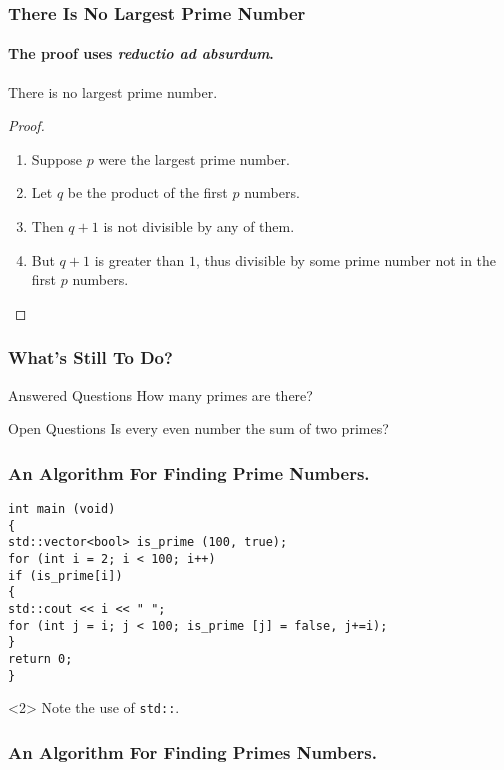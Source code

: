 \begin{frame}
\frametitle{There Is No Largest Prime Number}
\framesubtitle{The proof uses \textit{reductio ad absurdum}.}
\begin{theorem}
There is no largest prime number.
\end{theorem}
\begin{proof}
\begin{enumerate}
\item<1-> Suppose $p$ were the largest prime number.
\item<2-> Let $q$ be the product of the first $p$ numbers.
\item<3-> Then $q + 1$ is not divisible by any of them.
\item<1-> But $q + 1$ is greater than $1$, thus divisible by some prime
number not in the first $p$ numbers.\qedhere
\end{enumerate}
\end{proof}
\end{frame}

\begin{frame}
\frametitle{What’s Still To Do?}
\begin{block}{Answered Questions}
How many primes are there?
\end{block}
\begin{block}{Open Questions}
Is every even number the sum of two primes?
\end{block}
\end{frame}

\begin{frame}[fragile]
\frametitle{An Algorithm For Finding Prime Numbers.}
\begin{verbatim}
int main (void)
{
std::vector<bool> is_prime (100, true);
for (int i = 2; i < 100; i++)
if (is_prime[i])
{
std::cout << i << " ";
for (int j = i; j < 100; is_prime [j] = false, j+=i);
}
return 0;
}
\end{verbatim}
\begin{uncoverenv}<2>
Note the use of \verb|std::|.
\end{uncoverenv}
\end{frame}

\begin{frame}[fragile]
\frametitle{An Algorithm For Finding Primes Numbers.}
\begin{semiverbatim}
\end{semiverbatim}
\end{frame}


